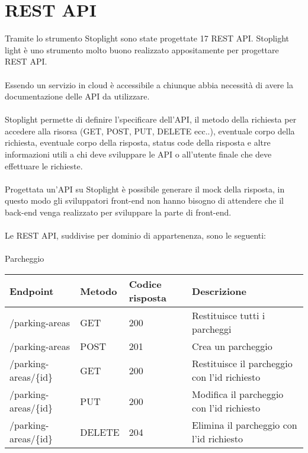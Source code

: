 \section{REST API}
Tramite lo strumento Stoplight sono state progettate 17 REST API. Stoplight light è uno strumento molto buono realizzato
appositamente per progettare REST API.
\\\\
Essendo un servizio in cloud è accessibile a chiunque abbia necessità di avere la documentazione delle API da utilizzare.
\\\\
Stoplight permette di definire l'specificare dell'API, il metodo della richiesta per accedere alla risorsa (GET, POST, PUT, DELETE ecc..),
eventuale corpo della richiesta, eventuale corpo della risposta, status code della risposta e altre informazioni
utili a chi deve sviluppare le API o all'utente finale che deve effettuare le richieste.
\\\\
Progettata un'API su Stoplight è possibile generare il mock della risposta, in questo modo gli sviluppatori front-end non hanno bisogno
di attendere che il back-end venga realizzato per sviluppare la parte di front-end.
\\\\
Le REST API, suddivise per dominio di appartenenza, sono le seguenti:
\\\\
Parcheggio
\\
\begin{table}
    \begin{tabular}{|p{3.2cm}|p{1.4cm}|p{1.4cm}|p{5.8cm}|} 
    \hline
    \textbf{Endpoint} & \textbf{Metodo} & \textbf{Codice risposta} & \textbf{Descrizione} \\ 
    \hline
    /parking-areas & GET & 200 & Restituisce tutti i parcheggi \\ 
    \hline
    /parking-areas & POST & 201 & Crea un parcheggio \\ 
    \hline
    /parking-areas/\{id\} & GET & 200 & Restituisce il parcheggio con l'id richiesto \\ 
    \hline
    /parking-areas/\{id\} & PUT & 200 & Modifica il parcheggio con l'id richiesto \\ 
    \hline
    /parking-areas/\{id\} & DELETE & 204 & Elimina il parcheggio con l'id richiesto \\ 
    \hline
    \end{tabular}
\end{table}
